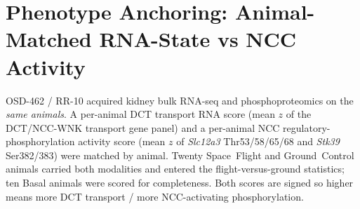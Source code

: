 \documentclass[10pt]{article}
\newcommand{\gene}[1]{\textit{#1}}
\begin{document}
\section{Phenotype Anchoring: Animal-Matched RNA-State vs NCC Activity}

OSD-462 / RR-10 acquired kidney bulk RNA-seq and phosphoproteomics on the \emph{same animals}. A per-animal DCT transport RNA score (mean $z$ of the DCT/NCC-WNK transport gene panel) and a per-animal NCC regulatory-phosphorylation activity score (mean $z$ of \gene{Slc12a3} Thr53/58/65/68 and \gene{Stk39} Ser382/383) were matched by animal. Twenty Space~Flight and Ground~Control animals carried both modalities and entered the flight-versus-ground statistics; ten Basal animals were scored for completeness. Both scores are signed so higher means more DCT transport / more NCC-activating phosphorylation.

\begin{table}[H]
\centering\small
\caption{\textbf{Animal-matched phenotype-anchoring comparison within OSD-462 / RR-10.} Three-level comparison with two pre-specified controls. Group effects are concordant (same sign) for the regulatory comparison; the regulatory phosphosite cluster is suppressed $\sim$4.3$\times$ more than non-regulatory sites ($-1.30$ vs $-0.30$). Per-animal correlations are positive throughout but non-significant. The condition-adjusted Spearman is computed on within-condition-centered residuals.}
\label{tab:phenoanchorfull}
\end{table}
\end{document}
